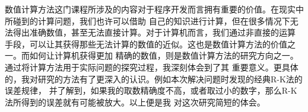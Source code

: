 \documentclass[lang=cn,a4paper,newtx]{elegantpaper}
\begin{document}
  数值计算方法这门课程所涉及的内容对于程序开发而言拥有重要的价值。在现实中所碰到的计算问题，我们也许可以借助
  自己的知识进行计算，但在很多情况下无法得出准确数值，甚至无法直接计算。对于计算机而言，我们通过非直接的运算
  手段，可以让其获得那些无法计算的数值的近似。这也是数值计算方法的价值之一。而如何让计算机获得更加
  精确的数值，则是数值计算方法的研究方向之一。通过将计算方法用于实际问题的探究过程，我深刻体会到了其
  重要意义。更具体的，我对研究的方法有了更深入的认识。例如本次解决问题时发现的经典R-K法的误差规律，
  并了解到，如果我的取数精确度不高，或者取过小的数字，那么R-K法所得到的误差就有可能被放大。以上便是我
  对这次研究简短的体会。
\nocite{*}
\printbibliography[heading=bibintoc, title=\ebibname]

\appendix
\addappheadtotoc
\end{document}
